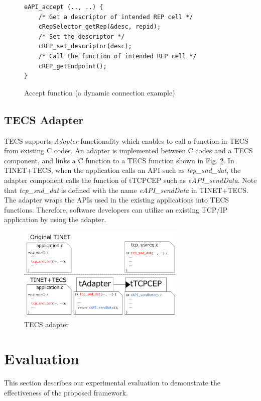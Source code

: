 \documentclass[conference]{IEEEtran/IEEEtran}
\begin{document}
\begin{figure}[t]
\centering
\begin{lstlisting}
eAPI_accept (.., ..) {
    /* Get a descriptor of intended REP cell */
    cRepSelector_getRep(&desc, repid);
    /* Set the descriptor */
    cREP_set_descriptor(desc);
    /* Call the function of intended REP cell */
    cREP_getEndpoint();
}
\end{lstlisting}
\caption{Accept function (a dynamic connection example)}
\label{src:DynamicCcode}
\end{figure}

\subsection{TECS Adapter}
\label{sec:TECS Adapter}

TECS supports {\it Adapter} functionality which enables to call a function in TECS from existing C codes.
An adapter is implemented between C codes and a TECS component, and links a C function to a TECS function shown in Fig. \ref{fig:TECS_Adapter}.
In TINET+TECS, when the application calls an API such as {\it tcp\_snd\_dat}, the adapter component calls the function of tTCPCEP such as {\it eAPI\_sendData}.
Note that {\it tcp\_snd\_dat} is defined with the name {\it eAPI\_sendData} in TINET+TECS.
The adapter wraps the APIs used in the existing applications into TECS functions.
Therefore, software developers can utilize an existing TCP/IP application by using the adapter.

\begin{figure}[t]
    \centering
    \includegraphics[width=8.0cm,clip]{figure/TECS_Adapter.pdf}
    \caption{TECS adapter}
    \label{fig:TECS_Adapter}
\end{figure}

\section{Evaluation}
\label{sec:Evaluation}

This section describes our experimental evaluation to demonstrate the effectiveness of the proposed framework.
\end{document}
